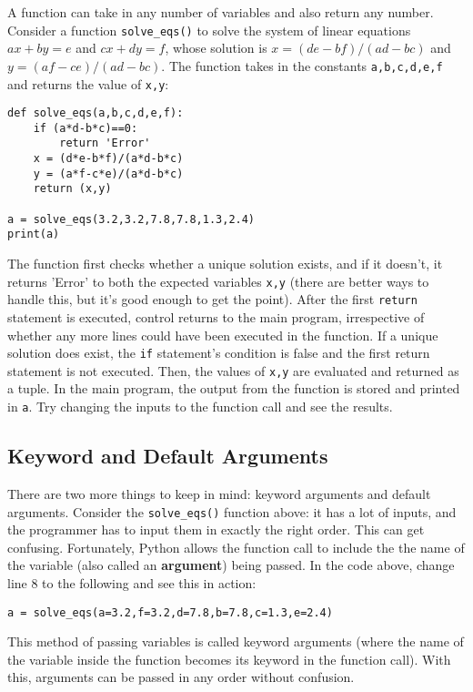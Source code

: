 \documentclass[12pt]{article}
\newcommand{\code}{\texttt}
\begin{document}
A function can take in any number of variables and also return any number. Consider a function \code{solve\_eqs()} to solve the system of linear equations $ax+by=e$ and $cx+dy=f$, whose solution is $x=(de-bf)/(ad-bc)$ and $y=(af-ce)/(ad-bc)$. The function takes in the constants \code{a,b,c,d,e,f} and returns the value of \code{x,y}:

\begin{lstlisting}[frame=single] 
def solve_eqs(a,b,c,d,e,f):
    if (a*d-b*c)==0:
        return 'Error'
    x = (d*e-b*f)/(a*d-b*c)
    y = (a*f-c*e)/(a*d-b*c)
    return (x,y)

a = solve_eqs(3.2,3.2,7.8,7.8,1.3,2.4)
print(a)
\end{lstlisting}

The function first checks whether a unique solution exists, and if it doesn't, it returns 'Error' to both the expected variables \code{x,y} (there are better ways to handle this, but it's good enough to get the point). After the first \code{return} statement is executed, control returns to the main program, irrespective of whether any more lines could have been executed in the function. If a unique solution does exist, the \code{if} statement's condition is false and the first return statement is not executed. Then, the values of \code{x,y} are evaluated and returned as a tuple. In the main program, the output from the function is stored and printed in \code{a}. Try changing the inputs to the function call and see the results.

\subsection{Keyword and Default Arguments}

There are two more things to keep in mind: keyword arguments and default arguments. Consider the \code{solve\_eqs()} function above: it has a lot of inputs, and the programmer has to input them in exactly the right order. This can get confusing. Fortunately, Python allows the function call to include the the name of the variable (also called an \textbf{argument}) being passed. In the code above, change line 8 to the following and see this in action:

\begin{lstlisting}[frame=single] 
a = solve_eqs(a=3.2,f=3.2,d=7.8,b=7.8,c=1.3,e=2.4)
\end{lstlisting}

This method of passing variables is called keyword arguments (where the name of the variable inside the function becomes its keyword in the function call). With this, arguments can be passed in any order without confusion. 
\end{document}
